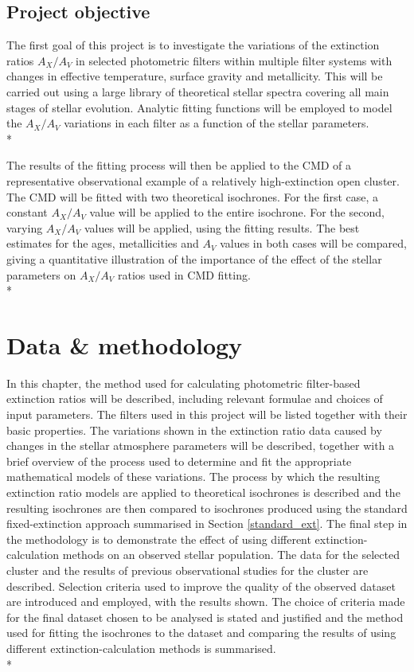 \documentclass[12pt, a4paper]{report}
\begin{document}
\section{Project objective}
The first goal of this project is to investigate the variations of the extinction ratios $A_{X}/A_{V}$ in selected photometric filters within multiple filter systems with changes in effective temperature, surface gravity and metallicity. This will be carried out using a large library of theoretical stellar spectra covering all main stages of stellar evolution. Analytic fitting functions will be employed to model the $A_{X}/A_{V}$ variations in each filter as a function of the stellar parameters. \\*

The results of the fitting process will then be applied to the CMD of a representative observational example of a relatively high-extinction open cluster. The CMD will be fitted with two theoretical isochrones. For the first case, a constant $A_{X}/A_{V}$ value will be applied to the entire isochrone. For the second, varying $A_{X}/A_{V}$ values will be applied, using the fitting results. The best estimates for the ages, metallicities and $A_{V}$ values in both cases will be compared, giving a quantitative illustration of the importance of the effect of the stellar parameters on $A_{X}/A_{V}$ ratios used in CMD fitting.\\*



\chapter{Data \& methodology}
In this chapter, the method used for calculating photometric filter-based extinction ratios will be described, including relevant formulae and choices of input parameters. The filters used in this project will be listed together with their basic properties. The variations shown in the extinction ratio data caused by changes in the stellar atmosphere parameters will be described, together with a brief overview of the process used to determine and fit the appropriate mathematical models of these variations. The process by which the resulting extinction ratio models are applied to theoretical isochrones is described and the resulting isochrones are then compared to isochrones produced using the standard fixed-extinction approach summarised in Section \ref{standard_ext}. The final step in the methodology is to demonstrate the effect of using different extinction-calculation methods on an observed stellar population. The data for the selected cluster and the results of previous observational studies for the cluster are described. Selection criteria used to improve the quality of the observed dataset are introduced and employed, with the results shown. The choice of criteria made for the final dataset chosen to be analysed is stated and justified and the method used for fitting the isochrones to the dataset and comparing the results of using different extinction-calculation methods is summarised.\\*
\end{document}
